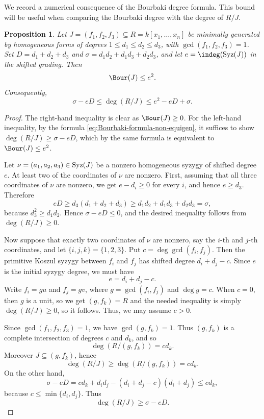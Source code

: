 \documentclass[11pt]{amsart} %
\newtheorem{Proposition}[Theorem]{Proposition}
\theoremstyle{definition}
\def\syz{\mbox{\rm Syz}}
\begin{document}
We record a numerical consequence of the Bourbaki degree formula. This bound will be useful when comparing the Bourbaki degree with the degree of $R/J$.

\begin{Proposition}\label{prop:basic-numerical-bound}
Let $J=(f_1,f_2,f_3)\subseteq R=k[x_1,\ldots,x_n]$ be minimally generated by
homogeneous forms of degrees $1\le d_1\le d_2\le d_3$, with
$\gcd(f_1,f_2,f_3)=1$. Set $D=d_1+d_2+d_3$ and
$\sigma=d_1d_2+d_1d_3+d_2d_3$, and let $e=\indeg(\syz(J))$ in the shifted
grading. Then
\[
\Bour(J)\le e^2.
\]
Consequently,
\[
\sigma-eD\le \deg(R/J)\le e^2-eD+\sigma.
\]
\end{Proposition}

\begin{proof}
The right-hand inequality is clear as $\Bour(J) \geq 0$. For the left-hand inequality, by the formula \eqref{eq:Bourbaki-formula-non-equigen}, it suffices to show $
\deg(R/J)\ge \sigma-eD$, which by the same formula is equivalent to $\Bour(J) \leq e^2$. 

Let $\nu=(a_1,a_2,a_3)\in\syz(J)$ be a nonzero homogeneous syzygy of shifted
degree $e$. At least two of the coordinates of $\nu$ are nonzero. First, assuming that all three coordinates of $\nu$ are nonzero, we get
$e-d_i\ge0$ for every $i$, and hence $e\ge d_3$. Therefore
\[
eD\ge d_3(d_1+d_2+d_3)\ge d_1d_2+d_1d_3+d_2d_3=\sigma,
\]
because $d_3^2\ge d_1d_2$. Hence $\sigma-eD\le0$, and the desired inequality
follows from $\deg(R/J)\ge0$.

Now suppose that exactly two coordinates of $\nu$ are nonzero, say the $i$-th
and $j$-th coordinates, and let $\{i,j,k\}=\{1,2,3\}$. Put
$c=\deg\gcd(f_i,f_j)$. Then the primitive Koszul syzygy between $f_i$ and
$f_j$ has shifted degree $d_i+d_j-c$. Since $e$ is the initial syzygy degree,
we must have
\[
e=d_i+d_j-c.
\]
Write $f_i=gu$ and $f_j=gv$, where $g=\gcd(f_i,f_j)$ and $\deg g=c$. When $c = 0$, then $g$ is a unit, so we get $(g, f_k) = R$ and the needed inequality is simply $\deg(R/J) \geq 0$, so it follows. Thus, we may assume $c > 0$.

Since
$\gcd(f_1,f_2,f_3)=1$, we have $\gcd(g,f_k)=1$. Thus $(g,f_k)$ is a complete
intersection of degrees $c$ and $d_k$, and so
\[
\deg(R/(g,f_k))=cd_k.
\]
Moreover $J\subseteq (g,f_k)$, hence
\[
\deg(R/J)\ge \deg(R/(g, f_k)) = cd_k.
\]
On the other hand,
\[
\sigma-eD
=cd_k+d_id_j-(d_i+d_j-c)(d_i+d_j)\le cd_k,
\]
because $c\le\min\{d_i,d_j\}$. Thus
\[
\deg(R/J)\ge \sigma-eD.
\]
\end{proof}
\end{document}
